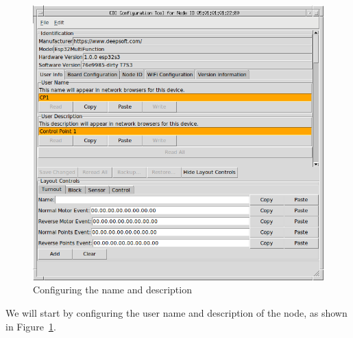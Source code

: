 \documentclass[12pt,twoside]{article}
\begin{document}
\begin{figure}[hbpt]\begin{centering}%
\includegraphics[width=5in]{ExampleSidingCP1-ConfigNameDescr.png}
\caption{Configuring the name and description}
\label{fig:ExampleSidingCP1-ConfigNameDescr}
\end{centering}\end{figure}

We will start by configuring the user name and description of the node, as 
shown in Figure~\ref{fig:ExampleSidingCP1-ConfigNameDescr}.
\end{document}
